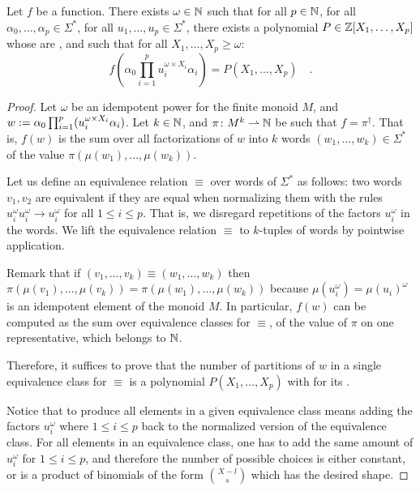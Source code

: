 \begin{lemma}
    \label{n-poly-combinatorics:lem}
    Let $f$ be a   function. 
    There exists $\omega \in \mathbb{N}$
    such that for all $p \in \mathbb{N}$,
    for all $\alpha_0, \dots, \alpha_p \in \Sigma^*$,
    for all $u_1, \dots, u_p \in \Sigma^*$,
    there exists a polynomial $P \in \mathbb{Z}[X_1, \dots, X_p]$
    whose  are ,
    and such that for all $X_1, \dots, X_p \geq \omega$:
    \begin{equation*}
        f\left(
            \alpha_0 \prod_{i = 1}^p u_i^{\omega \times X_i} \alpha_i
        \right)
        = P(X_1, \dots, X_p) \quad .
    \end{equation*}
\end{lemma}
\begin{proof}
    Let $\omega$ be an idempotent power for the finite monoid $M$,
    and
    $w \mathrel{:=} \alpha_0 \prod_{i = 1}^p (u_i^{\omega \times X_i} \alpha_i)$.
    Let $k \in \mathbb{N}$, and $\pi \colon M^k \rightharpoonup \mathbb{N}$ be such that
    $f = \pi^\dagger$. That is, 
    $f(w)$ is the sum over all factorizations of $w$
    into $k$ words $(w_1, \dots, w_k) \in \Sigma^*$
    of the value $\pi(\mu(w_1), \dots, \mu(w_k))$.

    Let us define an equivalence relation $\equiv$ over words of
    $\Sigma^*$ as follows: two words $v_1, v_2$ are equivalent if they are
    equal when normalizing them with the rules $u_i^{\omega} u_i^{\omega} \to
    u_i^{\omega}$ for all $1 \leq i \leq p$. That is, we disregard
    repetitions of the factors $u_i^{\omega}$ in the words.
    We lift the equivalence relation $\equiv$ to $k$-tuples of
    words by pointwise application.

    Remark that if $(v_1, \dots, v_k) \equiv (w_1, \dots, w_k)$ then
    $\pi(\mu(v_1), \dots, \mu(v_k)) = \pi(\mu(w_1), \dots, \mu(w_k))$ because
    $\mu(u_i^\omega) = \mu(u_i)^\omega$ is an idempotent element of the monoid
    $M$. In particular, $f(w)$ can be computed as the sum over equivalence
    classes for $\equiv$, of the value of $\pi$ on one representative,
    which belongs to $\mathbb{N}$.

    Therefore, it suffices to prove that the number of partitions of $w$ in a
    single equivalence class for $\equiv$ is a polynomial $P(X_1, \dots, X_p)$
    with  for its .

    Notice that to produce all elements in a given equivalence class
    means adding the factors $u_i^\omega$ where $1 \leq i \leq p$
    back to the normalized version
    of the equivalence class. For all elements in an equivalence class,
    one has to add the same amount of $u_i^\omega$ for $1 \leq i \leq p$,
    and therefore the number of possible choices
    is either constant, or 
    is a product of binomials of the form $\binom{X - l}{s}$
    which has the desired shape.
\end{proof}


